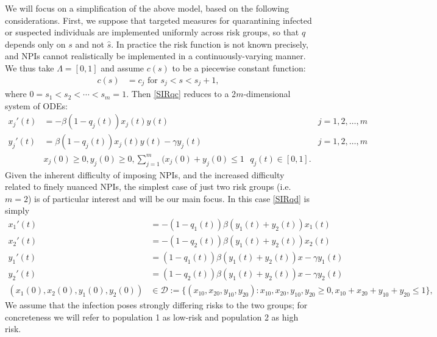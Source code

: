 \documentclass[english,12pt,letter]{article}
\newcommand{\dom}{{\mathcal D}}
\newcommand{\sdummy}{\hat{s}}
\begin{document}
We will focus on a simplification of the above model, based on the following considerations.
First, we suppose that targeted measures for quarantining infected or suspected individuals
are implemented uniformly across risk groups, so that $q$ depends only on $s$ and not $\sdummy$.
In practice the risk function is not known precisely, and NPIs cannot realistically be
implemented in a continuously-varying manner.  We thus take $\Lambda=[0,1]$ and
assume $c(s)$ to be a piecewise constant function:
\begin{align}
    c(s) & = c_j \text{ for } s_j < s < s_j+1,
\end{align}
where $0=s_1 < s_2 < \cdots < s_m=1$.
Then \eqref{SIRqc} reduces to a 2$m$-dimensional system of ODEs:
\begin{subequations} \label{SIRqd}
\begin{align} 
    x_j'(t) & = -\beta (1-q_j(t)) x_j(t)  y(t)  & j = 1, 2, \dots, m \\
    y_j'(t) & = \beta (1-q_j(t)) x_j(t)  y(t) - \gamma y_j(t) & j = 1, 2, \dots, m  \\
    & x_j(0)\ge 0,y_j(0) \ge 0, \sum_{j=1}^m (x_j(0)+y_j(0) \le 1 \ \ \ q_j(t) \in [0,1].
\end{align}
\end{subequations}
Given the inherent difficulty of imposing NPIs, and the increased difficulty related
to finely nuanced NPIs, the simplest case of just two risk groups (i.e. $m=2$)
is of particular interest and will be our main focus.  In this case \eqref{SIRqd} is
simply
\begin{subequations} \label{SIRq2}
\begin{align} 
    x_1'(t) & = -(1-q_1(t))\beta (y_1(t)+y_2(t)) x_1(t) \\
    x_2'(t) & = -(1-q_2(t))\beta (y_1(t)+y_2(t)) x_2(t) \\
    y_1'(t) & = (1-q_1(t))\beta (y_1(t)+y_2(t)) x - \gamma y_1(t) \\
    y_2'(t) & = (1-q_2(t))\beta (y_1(t)+y_2(t)) x - \gamma y_2(t) \\
    (x_1(0),x_2(0), y_1(0), y_2(0)) & \in \dom := \{(x_{10},x_{20},y_{10},y_{20}) : x_{10},x_{20},y_{10},y_{20} \ge 0, x_{10}+x_{20}+y_{10}+y_{20} \le 1\},
\end{align}
\end{subequations}
We assume that the infection poses strongly differing risks to the two groups;
for concreteness we will refer to population 1 as low-risk and population 2
as high risk.  
\end{document}

